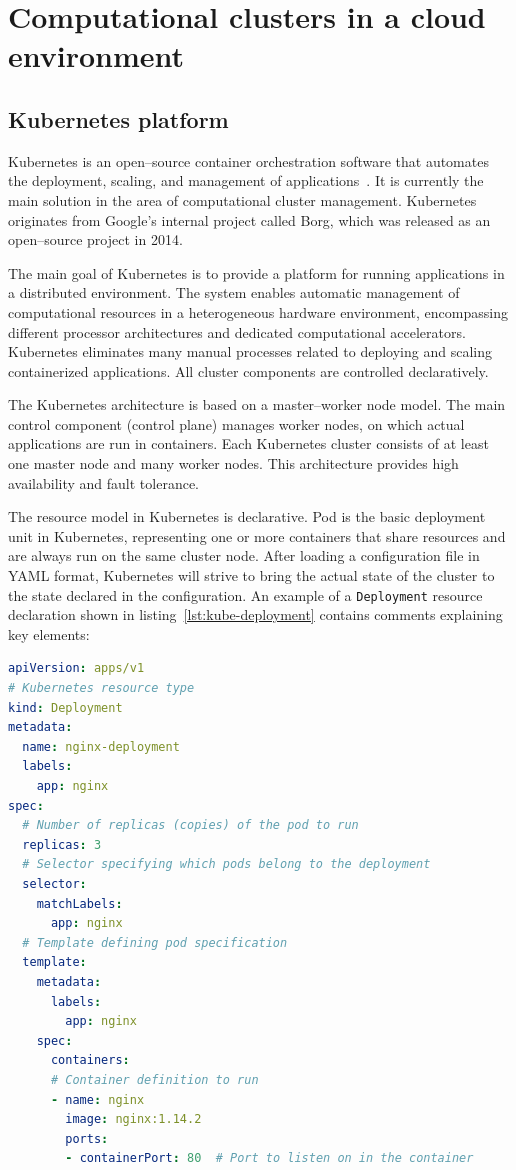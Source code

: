 \section{Computational clusters in a cloud environment}

\subsection{Kubernetes platform}

Kubernetes is an open--source container orchestration software that automates the deployment, scaling, and management of applications~\cite{kubernetes, container_orchestration}.
It is currently the main solution in the area of computational cluster management.
Kubernetes originates from Google's internal project called Borg, which was released as an open--source project in 2014.

The main goal of Kubernetes is to provide a platform for running applications in a distributed environment.
The system enables automatic management of computational resources in a heterogeneous hardware environment, encompassing different processor architectures and dedicated computational accelerators.
Kubernetes eliminates many manual processes related to deploying and scaling containerized applications.
All cluster components are controlled declaratively.

The Kubernetes architecture is based on a master--worker node model.
The main control component (control plane) manages worker nodes, on which actual applications are run in containers.
Each Kubernetes cluster consists of at least one master node and many worker nodes.
This architecture provides high availability and fault tolerance.

The resource model in Kubernetes is declarative.
Pod is the basic deployment unit in Kubernetes, representing one or more containers that share resources and are always run on the same cluster node.
After loading a configuration file in YAML format, Kubernetes will strive to bring the actual state of the cluster to the state declared in the configuration.
An example of a \texttt{Deployment} resource declaration shown in listing~\ref{lst:kube-deployment} contains comments explaining key elements:

\begin{lstlisting}[language=yaml,caption={Example Deployment declaration in Kubernetes},label={lst:kube-deployment}]
apiVersion: apps/v1
# Kubernetes resource type
kind: Deployment 
metadata:
  name: nginx-deployment
  labels:
    app: nginx
spec:
  # Number of replicas (copies) of the pod to run
  replicas: 3
  # Selector specifying which pods belong to the deployment
  selector:
    matchLabels:
      app: nginx
  # Template defining pod specification
  template:
    metadata:
      labels:
        app: nginx
    spec:
      containers:
      # Container definition to run
      - name: nginx
        image: nginx:1.14.2
        ports:
        - containerPort: 80  # Port to listen on in the container
\end{lstlisting}

